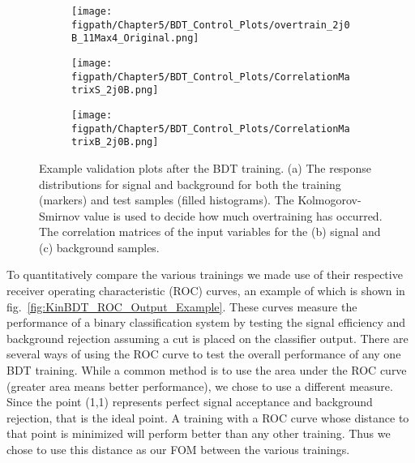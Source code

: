 \begin{figure}[!hbt]
    \centering
    \begin{subfigure}[t]{0.48\textwidth}
        \texttt{[image: \\figpath/Chapter5/BDT\_Control\_Plots/overtrain\_2j0B\_11Max4\_Original.png]}
        \caption{}
        \label{fig:KinBDT_Overtrain_Example}
    \end{subfigure}

    \begin{subfigure}[t]{0.48\textwidth}
        \texttt{[image: \\figpath/Chapter5/BDT\_Control\_Plots/CorrelationMatrixS\_2j0B.png]}
        \caption{}
        \label{fig:KinBDT_CorrelationMatrixS_Example}
    \end{subfigure}
    \begin{subfigure}[t]{0.48\textwidth}
        \texttt{[image: \\figpath/Chapter5/BDT\_Control\_Plots/CorrelationMatrixB\_2j0B.png]}
        \caption{}
        \label{fig:KinBDT_CorrelationMatrixB_Example}
    \end{subfigure}
    \caption{Example validation plots after the BDT training. (a) The response distributions for signal and background for both the training (markers) and test samples (filled histograms). The Kolmogorov-Smirnov value is used to decide how much overtraining has occurred. The correlation matrices of the input variables for the (b) signal and (c) background samples.}
    \label{fig:KinBDT_Example_Output}
\end{figure}

To quantitatively compare the various trainings we made use of their respective receiver operating characteristic (ROC) curves, an example of which is shown in fig.~\ref{fig:KinBDT_ROC_Output_Example}.
These curves measure the performance of a binary classification system by testing the signal efficiency and background rejection assuming a cut is placed on the classifier output.
There are several ways of using the ROC curve to test the overall performance of any one BDT training.
While a common method is to use the area under the ROC curve (greater area means better performance), we chose to use a different measure.
Since the point (1,1) represents perfect signal acceptance and background rejection, that is the ideal point.
A training with a ROC curve whose distance to that point is minimized will perform better than any other training.
Thus we chose to use this distance as our FOM between the various trainings.

